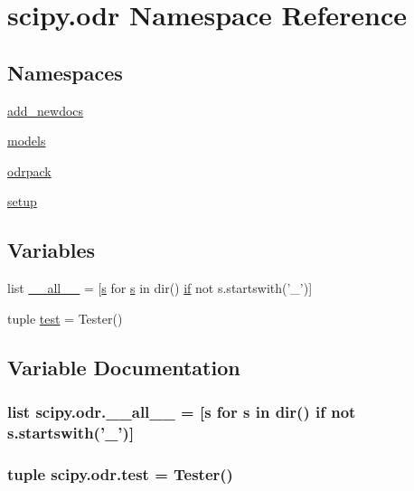 \hypertarget{namespacescipy_1_1odr}{}\section{scipy.\+odr Namespace Reference}
\label{namespacescipy_1_1odr}
\subsection*{Namespaces}
\begin{DoxyCompactItemize}
\item 
 \hyperlink{namespacescipy_1_1odr_1_1add__newdocs}{add\+\_\+newdocs}
\item 
 \hyperlink{namespacescipy_1_1odr_1_1models}{models}
\item 
 \hyperlink{namespacescipy_1_1odr_1_1odrpack}{odrpack}
\item 
 \hyperlink{namespacescipy_1_1odr_1_1setup}{setup}
\end{DoxyCompactItemize}
\subsection*{Variables}
\begin{DoxyCompactItemize}
\item 
list \hyperlink{namespacescipy_1_1odr_adb55b41e3e9d2104228d3c581744e215}{\+\_\+\+\_\+all\+\_\+\+\_\+} = \mbox{[}\hyperlink{indexexpr_8h_ae024b0db549122b44c349ae28ec990dc}{s} for \hyperlink{indexexpr_8h_ae024b0db549122b44c349ae28ec990dc}{s} in dir() \hyperlink{minmax_8h_a30a0ee9fee303f01d9c5e6f669e0dfe9}{if} not s.\+startswith('\+\_\+')\mbox{]}
\item 
tuple \hyperlink{namespacescipy_1_1odr_a7216c7357f1ef6a2afb992a161f74063}{test} = Tester()
\end{DoxyCompactItemize}


\subsection{Variable Documentation}
\hypertarget{namespacescipy_1_1odr_adb55b41e3e9d2104228d3c581744e215}{}
\subsubsection[{\+\_\+\+\_\+all\+\_\+\+\_\+}]{\setlength{\rightskip}{0pt plus 5cm}list scipy.\+odr.\+\_\+\+\_\+all\+\_\+\+\_\+ = \mbox{[}{\bf s} for {\bf s} in dir() {\bf if} not s.\+startswith('\+\_\+')\mbox{]}}\label{namespacescipy_1_1odr_adb55b41e3e9d2104228d3c581744e215}
\hypertarget{namespacescipy_1_1odr_a7216c7357f1ef6a2afb992a161f74063}{}
\subsubsection[{test}]{\setlength{\rightskip}{0pt plus 5cm}tuple scipy.\+odr.\+test = Tester()}\label{namespacescipy_1_1odr_a7216c7357f1ef6a2afb992a161f74063}
